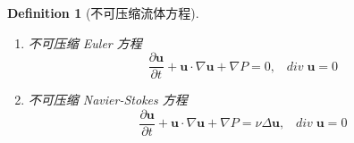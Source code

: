 \documentclass[11pt]{article}
\newtheorem{definition}{Definition}[subsection]
\begin{document}
\begin{definition}[\kaishu 不可压缩流体方程]
	\text{}
	
	\vspace{-0.5cm}
	
	\begin{enumerate}
		\item 不可压缩 Euler 方程
		\begin{equation}
		\frac{{\partial \boldsymbol{u}}}{{\partial t}} + \boldsymbol{u} \cdot \nabla \boldsymbol{u} + \nabla P = 0,\;\;\;div\;\boldsymbol{u} = 0
		\label{eq5.2.8}
		\end{equation}
		\item 不可压缩 Navier-Stokes 方程
		\begin{equation}
		\frac{{\partial \boldsymbol{u}}}{{\partial t}} + \boldsymbol{u} \cdot \nabla \boldsymbol{u} + \nabla P = \nu \Delta \boldsymbol{u},\;\;\;div\;\boldsymbol{u} = 0
		\label{eq5.2.9}
		\end{equation}
	\end{enumerate}
\end{definition}
\end{document}
